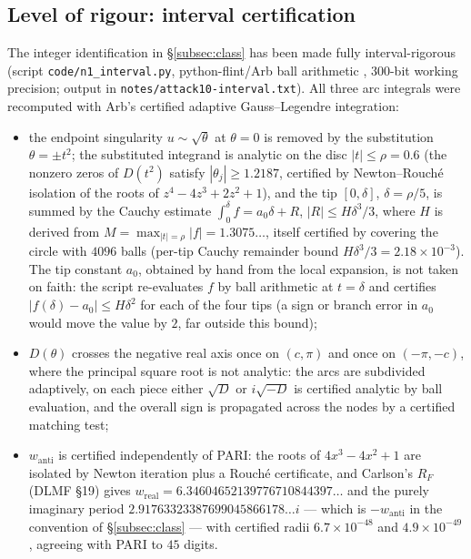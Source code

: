 \documentclass[11pt]{amsart}
\theoremstyle{definition}
\theoremstyle{remark}
\begin{document}
\subsection{Level of rigour: interval certification}
\label{subsec:rigour}

The integer identification in \S\ref{subsec:class} has been made fully
interval-rigorous (script \texttt{code/n1\_interval.py}, python-flint/Arb
ball arithmetic \cite{Arb}, $300$-bit working precision; output in
\texttt{notes/attack10-interval.txt}).  All three arc integrals were
recomputed with Arb's certified adaptive Gauss--Legendre integration:
\begin{itemize}
  \item the endpoint singularity $u\sim\sqrt{\theta}$ at $\theta=0$ is removed
  by the substitution $\theta=\pm t^{2}$; the substituted integrand is
  analytic on the disc $|t|\le\rho=0.6$ (the nonzero zeros of $D(t^{2})$
  satisfy $|\theta_{j}|\ge1.2187$, certified by Newton--Rouch\'e isolation of
  the roots of $z^{4}-4z^{3}+2z^{2}+1$), and the tip $[0,\delta]$, $\delta=\rho/5$,
  is summed by the Cauchy estimate $\int_{0}^{\delta}f=a_{0}\delta+R$,
  $|R|\le H\delta^{3}/3$, where $H$ is derived from
  $M=\max_{|t|=\rho}|f|=1.3075\ldots$, itself certified by covering the
  circle with $4096$ balls (per-tip Cauchy remainder bound
  $H\delta^{3}/3=2.18\times10^{-3}$). The tip constant $a_{0}$, obtained by
  hand from the local expansion, is not taken on faith: the script
  re-evaluates $f$ by ball arithmetic at $t=\delta$ and certifies
  $|f(\delta)-a_{0}|\le H\delta^{2}$ for each of the four tips (a sign or
  branch error in $a_{0}$ would move the value by $2$, far outside this
  bound);
  \item $D(\theta)$ crosses the negative real axis once on $(c,\pi)$ and once
  on $(-\pi,-c)$, where the principal square root is not analytic: the arcs
  are subdivided adaptively, on each piece either $\sqrt{D}$ or $i\sqrt{-D}$
  is certified analytic by ball evaluation, and the overall sign is
  propagated across the nodes by a certified matching test;
  \item $w_{\mathrm{anti}}$ is certified independently of PARI: the roots of
  $4x^{3}-4x^{2}+1$ are isolated by Newton iteration plus a Rouch\'e
  certificate, and Carlson's $R_{F}$ (DLMF \S19) gives
  $w_{\mathrm{real}}=6.34604652139776710844397\ldots$ and the purely
  imaginary period $2.91763323387699045866178\ldots i$ --- which is
  $-w_{\mathrm{anti}}$ in the convention of \S\ref{subsec:class} --- with
  certified radii $6.7\times10^{-48}$ and $4.9\times10^{-49}$, agreeing with
  PARI to $45$ digits.
\end{itemize}
\end{document}
